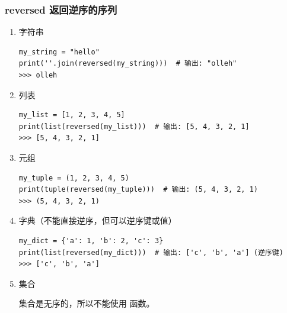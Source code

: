 \subsubsection{reversed 返回逆序的序列}
\begin{enumerate}[label=\arabic*)]
    \item 字符串
\begin{lstlisting}[style=demostyle,numbers=none]
my_string = "hello"
print(''.join(reversed(my_string)))  # 输出: "olleh"
>>> olleh
\end{lstlisting}

    \item 列表
\begin{lstlisting}[style=demostyle,numbers=none]
my_list = [1, 2, 3, 4, 5]
print(list(reversed(my_list)))  # 输出: [5, 4, 3, 2, 1]
>>> [5, 4, 3, 2, 1]
\end{lstlisting}

    \item 元组
\begin{lstlisting}[style=demostyle,numbers=none]
my_tuple = (1, 2, 3, 4, 5)
print(tuple(reversed(my_tuple)))  # 输出: (5, 4, 3, 2, 1)
>>> (5, 4, 3, 2, 1)
\end{lstlisting}

    \item 字典（不能直接逆序，但可以逆序键或值）
\begin{lstlisting}[style=demostyle,numbers=none]
my_dict = {'a': 1, 'b': 2, 'c': 3}
print(list(reversed(my_dict)))  # 输出: ['c', 'b', 'a'] (逆序键)
>>> ['c', 'b', 'a']
\end{lstlisting}

    \item 集合

    集合是无序的，所以不能使用  函数。
\end{enumerate}



